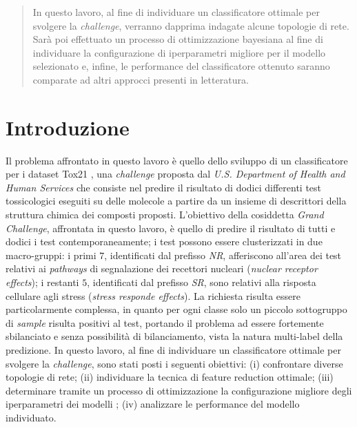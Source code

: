 \begin{abstract}
In questo lavoro,  al fine di individuare un classificatore ottimale per svolgere la \textit{challenge}, verranno dapprima indagate alcune topologie di rete. 
Sarà poi effettuato un processo di ottimizzazione bayesiana al fine di individuare la configurazione di iperparametri migliore per il modello selezionato e, infine, le performance del classificatore ottenuto saranno comparate ad altri approcci presenti in letteratura.
\end{abstract}

\newpage
{}
\section{Introduzione}
Il problema affrontato in questo lavoro è quello dello sviluppo di un classificatore per i dataset Tox21 \cite{challenge_site}, una \textit{challenge} proposta dal \textit{U.S. Department of Health and Human Services} che consiste nel predire il risultato di dodici differenti test tossicologici eseguiti su delle molecole a partire da un insieme di descrittori della struttura chimica dei composti proposti.
L'obiettivo della cosiddetta \textit{Grand Challenge}, affrontata in questo lavoro, è quello di predire il risultato di tutti e dodici i test contemporaneamente; i test possono essere clusterizzati in due macro-gruppi: i primi $7$, identificati dal prefisso \textit{NR}, afferiscono all'area dei test relativi ai \textit{pathways} di segnalazione dei recettori nucleari (\textit{nuclear receptor effects}); i restanti $5$, identificati dal prefisso \textit{SR}, sono relativi alla risposta cellulare agli stress (\textit{stress responde effects}).
La richiesta risulta essere particolarmente complessa, in quanto per ogni classe solo un piccolo sottogruppo di \textit{sample} risulta positivi al test, portando il problema ad essere fortemente sbilanciato e senza possibilità di bilanciamento, vista la natura multi-label della predizione.
In questo lavoro,  al fine di individuare un classificatore ottimale per svolgere la \textit{challenge}, sono stati posti i seguenti obiettivi: (i) confrontare diverse topologie di rete; (ii) individuare la tecnica di feature reduction ottimale; (iii) determinare tramite un processo di ottimizzazione la configurazione migliore degli iperparametri dei modelli ; (iv) analizzare le performance del modello individuato.